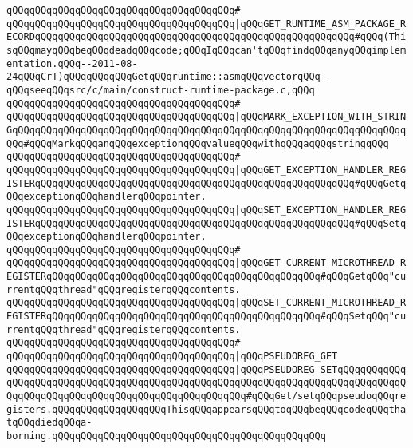 \verb|qQQqqQQqqQQqqQQqqQQqqQQqqQQqqQQqqQQqqQQq#|\newline
\verb|qQQqqQQqqQQqqQQqqQQqqQQqqQQqqQQqqQQqqQQq|\verb#|qQQqGET_RUNTIME_ASM_PACKAGE_RECORDqQQqqQQqqQQqqQQqqQQqqQQqqQQqqQQqqQQqqQQqqQQqqQQqqQQqqQQq#\verb|#qQQq(ThisqQQqmayqQQqbeqQQqdeadqQQqcode;qQQqIqQQqcan'tqQQqfindqQQqanyqQQqimplementation.qQQq--2011-08-24qQQqCrT)qQQqqQQqqQQqGetqQQqruntime::asmqQQqvectorqQQq--qQQqseeqQQqsrc/c/main/construct-runtime-package.c,qQQq|\newline
\verb|qQQqqQQqqQQqqQQqqQQqqQQqqQQqqQQqqQQqqQQq#|\newline
\verb|qQQqqQQqqQQqqQQqqQQqqQQqqQQqqQQqqQQqqQQq|\verb#|qQQqMARK_EXCEPTION_WITH_STRINGqQQqqQQqqQQqqQQqqQQqqQQqqQQqqQQqqQQqqQQqqQQqqQQqqQQqqQQqqQQqqQQqqQQqqQQq#\verb|#qQQqMarkqQQqanqQQqexceptionqQQqvalueqQQqwithqQQqaqQQqstringqQQq|\newline
\verb|qQQqqQQqqQQqqQQqqQQqqQQqqQQqqQQqqQQqqQQq#|\newline
\verb|qQQqqQQqqQQqqQQqqQQqqQQqqQQqqQQqqQQqqQQq|\verb#|qQQqGET_EXCEPTION_HANDLER_REGISTERqQQqqQQqqQQqqQQqqQQqqQQqqQQqqQQqqQQqqQQqqQQqqQQqqQQqqQQq#\verb|#qQQqGetqQQqexceptionqQQqhandlerqQQqpointer.|\newline
\verb|qQQqqQQqqQQqqQQqqQQqqQQqqQQqqQQqqQQqqQQq|\verb#|qQQqSET_EXCEPTION_HANDLER_REGISTERqQQqqQQqqQQqqQQqqQQqqQQqqQQqqQQqqQQqqQQqqQQqqQQqqQQqqQQq#\verb|#qQQqSetqQQqexceptionqQQqhandlerqQQqpointer.|\newline
\verb|qQQqqQQqqQQqqQQqqQQqqQQqqQQqqQQqqQQqqQQq#|\newline
\verb|qQQqqQQqqQQqqQQqqQQqqQQqqQQqqQQqqQQqqQQq|\verb#|qQQqGET_CURRENT_MICROTHREAD_REGISTERqQQqqQQqqQQqqQQqqQQqqQQqqQQqqQQqqQQqqQQqqQQqqQQq#\verb|#qQQqGetqQQq"currentqQQqthread"qQQqregisterqQQqcontents.|\newline
\verb|qQQqqQQqqQQqqQQqqQQqqQQqqQQqqQQqqQQqqQQq|\verb#|qQQqSET_CURRENT_MICROTHREAD_REGISTERqQQqqQQqqQQqqQQqqQQqqQQqqQQqqQQqqQQqqQQqqQQqqQQq#\verb|#qQQqSetqQQq"currentqQQqthread"qQQqregisterqQQqcontents.|\newline
\verb|qQQqqQQqqQQqqQQqqQQqqQQqqQQqqQQqqQQqqQQq#|\newline
\verb|qQQqqQQqqQQqqQQqqQQqqQQqqQQqqQQqqQQqqQQq|\verb#|qQQqPSEUDOREG_GET#\newline
\verb|qQQqqQQqqQQqqQQqqQQqqQQqqQQqqQQqqQQqqQQq|\verb#|qQQqPSEUDOREG_SETqQQqqQQqqQQqqQQqqQQqqQQqqQQqqQQqqQQqqQQqqQQqqQQqqQQqqQQqqQQqqQQqqQQqqQQqqQQqqQQqqQQqqQQqqQQqqQQqqQQqqQQqqQQqqQQqqQQqqQQqqQQq#\verb|#qQQqGet/setqQQqpseudoqQQqregisters.qQQqqQQqqQQqqQQqqQQqThisqQQqappearsqQQqtoqQQqbeqQQqcodeqQQqthatqQQqdiedqQQqa-borning.qQQqqQQqqQQqqQQqqQQqqQQqqQQqqQQqqQQqqQQqqQQqqQQq|\newline
